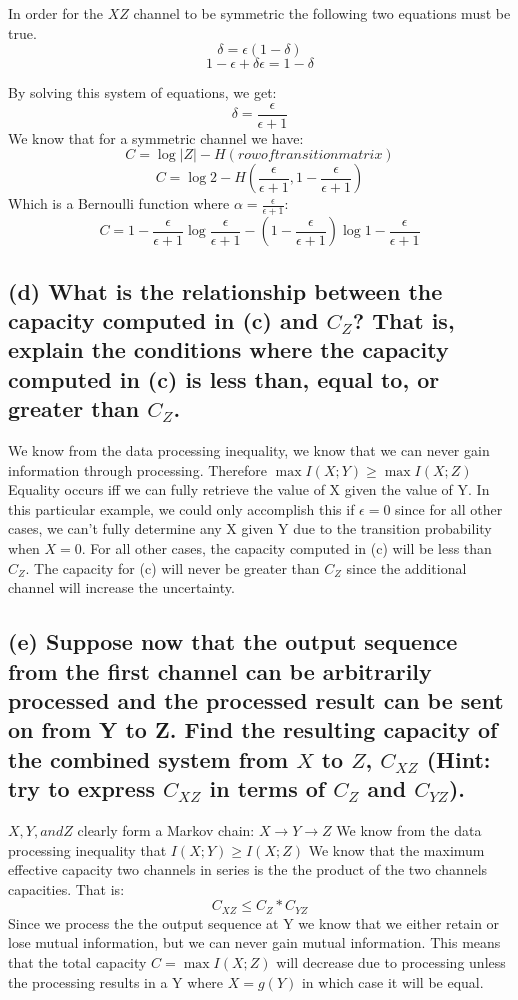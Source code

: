 \documentclass[11pt, oneside]{book}   	%
\begin{document}
In order for the $XZ$ channel to be symmetric the following two equations must be true.
$$\delta=\epsilon (1 - \delta)$$
$$1-\epsilon + \delta \epsilon = 1-\delta$$

By solving this system of equations, we get:
$$\delta = \frac{\epsilon}{\epsilon+1}$$
We know that for a symmetric channel we have:
$$C = \log{|Z|} - H(row of transition matrix)$$
$$C = \log{2} - H(\frac{\epsilon}{\epsilon +1}, 1-\frac{\epsilon}{\epsilon+1})$$
Which is a Bernoulli function where $\alpha = \frac{\epsilon}{\epsilon +1}$:
$$C=1-\frac{\epsilon}{\epsilon +1}\log{\frac{\epsilon}{\epsilon +1} - (1-\frac{\epsilon}{\epsilon +1})\log{1-\frac{\epsilon}{\epsilon +1}}}$$

\subsection*{(d) What is the relationship between the capacity computed in (c) and $C_Z$? That is, explain the conditions where the capacity computed in (c) is less than, equal to, or greater than $C_Z$.}

We know from the data processing inequality, we know that we can never gain information through processing.  Therefore $\max{I(X;Y)} \geq \max{I(X;Z)}$  Equality occurs iff we can fully retrieve the value of X given the value of Y.  In this particular example, we could only accomplish this if $\epsilon=0$ since for all other cases, we can't fully determine any X given Y due to the transition probability when $X=0$.  For all other cases, the capacity computed in (c) will be less than $C_Z$.  The capacity for (c) will never be greater than $C_Z$ since the additional channel will increase the uncertainty.

\subsection*{(e) Suppose now that the output sequence from the first channel can be arbitrarily processed and the processed result can be sent on from Y to Z.  Find the resulting capacity of the combined system from $X$ to $Z$, $C_{XZ}$ (Hint: try to express $C_{XZ}$ in terms of $C_Z$ and $C_{YZ}$).}

$X, Y, and Z$ clearly form a Markov chain: $X \rightarrow Y \rightarrow Z$
We know from the data processing inequality that $I(X;Y)\geq I(X;Z)$
We know that the maximum effective capacity two channels in series is the the product of the two channels capacities.  That is:
$$C_{XZ} \leq C_{Z}*C_{YZ}$$
Since we process the the output sequence at Y we know that we either retain or lose mutual information, but we can never gain mutual information.  This means that the total capacity $C=\max{I(X;Z)}$ will decrease due to processing unless the processing results in a Y where $X = g(Y)$ in which case it will be equal.
\end{document}

